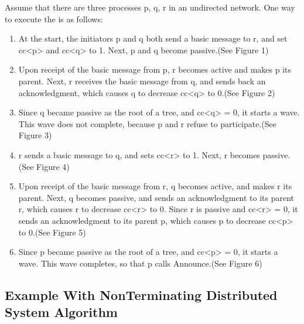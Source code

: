 \documentclass[letterpaper,10pt,english]{sphinxmanual}
\begin{document}
\sphinxAtStartPar
Assume that there are three processes p, q, r in an undirected network. One way to execute the {\hyperref[\detokenize{docs/ShavitFrancez/algorithm:shavitfrancezterminationdetectionalgorithm}]{}} is as follows:
\begin{enumerate}
%
\item {} 
\sphinxAtStartPar
At the start, the initiators p and q both send a basic message to r, and set cc\textless{}p\textgreater{} and cc\textless{}q\textgreater{} to 1. Next, p and q become passive.(See Figure 1)

\item {} 
\sphinxAtStartPar
Upon receipt of the basic message from p, r becomes active and makes p its parent. Next, r receives the basic message from q, and sends back an acknowledgment, which causes q to decrease cc\textless{}q\textgreater{} to 0.(See Figure 2)

\item {} 
\sphinxAtStartPar
Since q became passive as the root of a tree, and cc\textless{}q\textgreater{} = 0, it starts a wave. This wave does not complete, because p and r refuse to participate.(See Figure 3)

\item {} 
\sphinxAtStartPar
r sends a basic message to q, and sets cc\textless{}r\textgreater{} to 1. Next, r becomes passive.(See Figure 4)

\item {} 
\sphinxAtStartPar
Upon receipt of the basic message from r, q becomes active, and makes r its parent. Next, q becomes passive, and sends an acknowledgment to its parent r, which causes r to decrease cc\textless{}r\textgreater{} to 0. Since r is passive and cc\textless{}r\textgreater{} = 0, it sends an acknowledgment to its parent p, which causes p to decrease cc\textless{}p\textgreater{} to 0.(See Figure 5)

\item {} 
\sphinxAtStartPar
Since p became passive as the root of a tree, and cc\textless{}p\textgreater{} = 0, it starts a wave. This wave completes, so that p calls Announce.(See Figure 6)

\end{enumerate}


\subsection{Example With Non\sphinxhyphen{}Terminating Distributed System Algorithm}
\label{\detokenize{docs/ShavitFrancez/algorithm:example-with-non-terminating-distributed-system-algorithm}}
\end{document}
